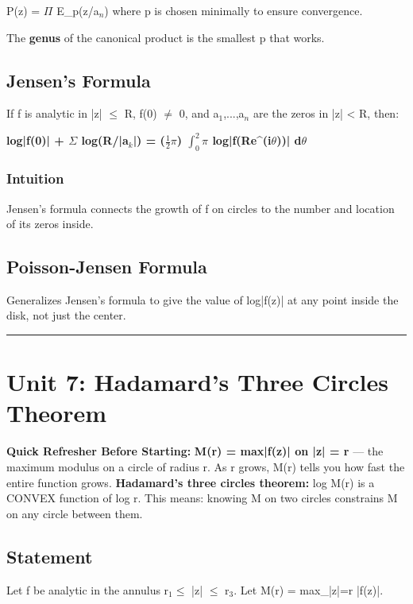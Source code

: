 \documentclass[12pt,a4paper,openany]{book}
\begin{document}
{{P(z) = $\Pi$ E_p(z/a$_n$) where p is chosen minimally to ensure convergence.

The \textbf{genus} of the canonical product is the smallest p that works.

\subsection{Jensen's Formula }

If f is analytic in |z| $\leq$ R, f(0) $\neq$ 0, and a$_1$,...,a$_n$ are the zeros in |z| < R, then:

\textbf{log|f(0)| + $\Sigma$ log(R/|a$_k$|) = ($\frac{1}{2}$$\pi$) $\int_0^2\pi$ log|f(Re^(i$\theta$))| d$\theta$}

\subsubsection{Intuition}
Jensen's formula connects the growth of f on circles to the number and location of its zeros inside.

\subsection{Poisson-Jensen Formula}
Generalizes Jensen's formula to give the value of log|f(z)| at any point inside the disk, not just the center.

\bigskip\noindent\rule{\textwidth}{0.4pt}\bigskip

\section{Unit 7: Hadamard's Three Circles Theorem}

\begin{prereqbox}
 \textbf{Quick Refresher Before Starting:}
\textbf{M(r) = max|f(z)| on |z| = r} — the maximum modulus on a circle of radius r.
As r grows, M(r) tells you how fast the entire function grows.
\textbf{Hadamard's three circles theorem:} log M(r) is a CONVEX function of log r.
This means: knowing M on two circles constrains M on any circle between them.
\end{prereqbox}


\subsection{Statement}

Let f be analytic in the annulus r$_1\leq$ |z| $\leq$ r$_3$. Let M(r) = max_{|z|=r} |f(z)|.

}}
\end{document}
